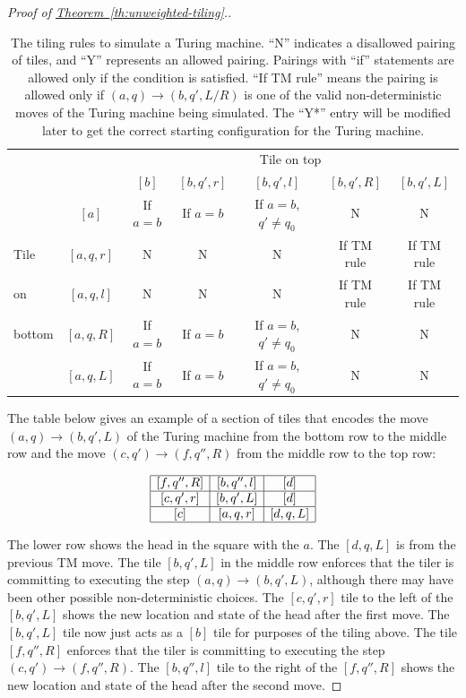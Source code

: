 \documentclass[10pt]{article}
\theoremstyle{definition}
\numberwithin{equation}{section}
\newcommand{\expref}[2]{\texorpdfstring{\hyperref[#2]{#1~\ref{#2}}}{#1~\ref{#2}}}
\begin{document}
\begin{proof}[Proof of \expref{Theorem}{th:unweighted-tiling}.]
\begin{table}
\begin{centering}
\bigskip
\begin{tabular}{lc|ccccc}
       &             &                \multicolumn{5}{c}{Tile on top} \\
       &             & $[b]$    & $[b,q',r]$ & $[b,q',l]$                & $[b,q',R]$ & $[b,q',L]$ \\
 \hline
       & $[a]$       & If $a=b$ &  If $a=b$  &  If $a=b$, $q' \neq q_0$  &     N      &     N   \\
Tile   & $[a,q,r]$   &    N     &     N      &     N                     & If TM rule & If TM rule \\
on     & $[a,q,l]$   &    N     &     N      &     N                     & If TM rule & If TM rule \\
bottom & $[a,q,R]$   & If $a=b$ &  If $a=b$  &  If $a=b$, $q' \neq q_0$  &     N      &     N   \\
       & $[a,q,L]$   & If $a=b$ &  If $a=b$  &  If $a=b$, $q' \neq q_0$  &     N      &     N   \\
\end{tabular}
\caption{The tiling rules to simulate a Turing machine.  ``N'' indicates a disallowed pairing of tiles, and ``Y'' represents an allowed pairing.  Pairings with ``if'' statements are allowed only if the condition is satisfied.  ``If TM rule'' means the pairing is allowed only if $(a,q) \rightarrow (b,q',L/R)$ is one of the valid non-deterministic moves of the Turing machine being simulated.  The ``Y*'' entry will be modified later to get the correct starting configuration for the Turing machine. }
\label{table:TM}
\end{centering}
\end{table}
%
%
The table below gives an example of a section of tiles that
encodes the move $(a,q) \rightarrow (b,q',L)$ of the Turing machine from the bottom
row to the middle row and the move $(c,q') \rightarrow (f,q'',R)$ from
the middle row to the top row:

\[
\begin{array}{|c|c|c|}
\hline
[f,q'',R] & [b,q'',l] & [d] \\
\hline
[c,q',r] & [b,q',L] & [d] \\
\hline
[c] & [a,q,r] & [d,q,L]\\
\hline
\end{array}
\]

The lower row shows the head in the square with the $a$. The $[d,q,L]$
is from the previous TM move.
The tile $[b,q',L]$ in the middle row
enforces that the tiler is committing to executing the
step $(a,q) \rightarrow (b,q',L)$, although there may have been
other possible non-deterministic choices. The $[c,q',r]$ tile to the left of
the $[b,q',L]$ shows the new location and state of the head after the first move.
The $[b,q',L]$ tile now just acts as a $[b]$ tile for purposes of
the tiling above. The tile $[f,q'',R]$ enforces that the
tiler is committing to executing the step $(c,q') \rightarrow (f,q'',R)$.
The $[b,q'',l]$ tile to the right of
the $[f,q'',R]$ shows the new location and state of the head after the second move.



\end{proof}
\end{document}
